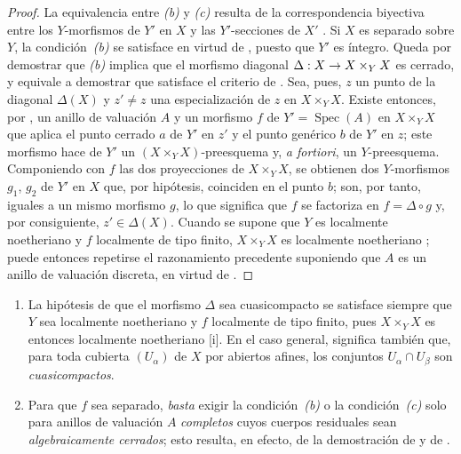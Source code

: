 \documentclass[oneside,10pt]{amsart}
\makeatletter
\newcommand{\ega@arrow}[2]{\mathchoice{#1}{#2}{#2}{#2}}
\renewcommand{\to}{\ega@arrow{\longrightarrow}{\rightarrow}}
\let\EGAOriginalLabel\label
\renewcommand{\label}[1]{\phantomsection\EGAOriginalLabel{#1}}
\makeatother
\begin{document}
\begin{proof}
La equivalencia entre \emph{(b)} y \emph{(c)} resulta de la correspondencia biyectiva entre los $Y$-morfismos de $Y'$ en $X$ y las $Y'$-secciones de $X'$ .
Si $X$ es separado sobre $Y$, la condición~\emph{(b)} se satisface en virtud de , puesto que $Y'$ es íntegro.
Queda por demostrar que \emph{(b)} implica que el morfismo diagonal
$\Delta:X\to X\times_YX$
es cerrado, y equivale a demostrar que satisface el criterio de .
Sea, pues, $z$ un punto de la diagonal $\Delta(X)$ y $z'\neq z$ una especialización de $z$ en $X\times_YX$.
Existe entonces, por , un anillo de valuación $A$ y un morfismo $f$ de $Y'=\operatorname{Spec}(A)$ en $X\times_YX$ que aplica el punto cerrado $a$ de $Y'$ en $z'$ y el punto genérico $b$ de $Y'$ en $z$;
este morfismo hace de $Y'$ un $(X\times_YX)$-preesquema y, \emph{a fortiori}, un $Y$-preesquema.
Componiendo con $f$ las dos proyecciones de $X\times_YX$, se obtienen dos $Y$-morfismos $g_1$, $g_2$ de $Y'$ en $X$ que, por hipótesis, coinciden en el punto $b$;
son, por tanto, iguales a un mismo morfismo $g$, lo que significa  que $f$ se factoriza en $f=\Delta\circ g$ y, por consiguiente, $z'\in\Delta(X)$.
Cuando se supone que $Y$ es localmente noetheriano y $f$ localmente de tipo finito, $X\times_YX$ es localmente noetheriano ;
puede entonces repetirse el razonamiento precedente suponiendo que $A$ es un anillo de valuación discreta, en virtud de .
\end{proof}

\begin{remark}[7.2.4]
\label{II.7.2.4-fr}
\begin{enumerate}
  \item[\rm{(i)}] La hipótesis de que el morfismo $\Delta$ sea cuasicompacto se satisface siempre que $Y$ sea localmente noetheriano y $f$ localmente de tipo finito, pues $X\times_YX$ es entonces localmente noetheriano [i].
  En el caso general, significa también que, para toda cubierta $(U_\alpha)$ de $X$ por abiertos afines, los conjuntos $U_\alpha\cap U_\beta$ son \emph{cuasicompactos}.
  \item[\rm{(ii)}] Para que $f$ sea separado, \emph{basta} exigir la condición~\emph{(b)} o la condición~\emph{(c)} solo para anillos de valuación $A$ \emph{completos} cuyos cuerpos residuales sean \emph{algebraicamente cerrados};
  esto resulta, en efecto, de la demostración de  y de .
\end{enumerate}
\end{remark}
\end{document}
